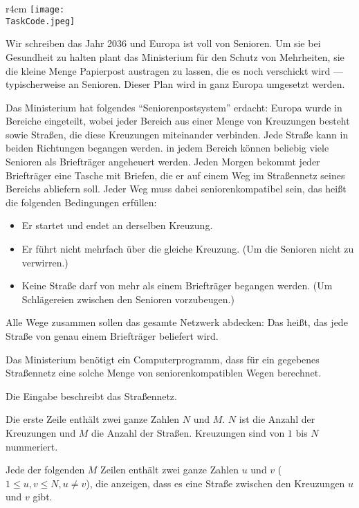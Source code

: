 \documentclass{boi2014-de}
\renewcommand{\TaskCode}{postmen}
\begin{document}
    \begin{wrapfigure}[8]{r}{4cm}
        \vspace{-18pt}
		\texttt{[image: \\TaskCode.jpeg]}
	\end{wrapfigure}
    Wir schreiben das Jahr 2036 und Europa ist voll von Senioren. Um sie bei Gesundheit zu halten plant das Ministerium für den Schutz von Mehrheiten, sie die kleine Menge Papierpost austragen zu lassen, die es noch verschickt wird --- typischerweise an Senioren. Dieser Plan wird in ganz Europa umgesetzt werden.
    
    Das Ministerium hat folgendes ``Seniorenpostsystem'' erdacht: Europa wurde in Bereiche eingeteilt, wobei jeder Bereich aus einer Menge von Kreuzungen besteht sowie Straßen, die diese Kreuzungen miteinander verbinden. Jede Straße kann in beiden Richtungen begangen werden. in jedem Bereich können beliebig viele Senioren als Briefträger angeheuert werden. Jeden Morgen bekommt jeder Briefträger eine Tasche mit Briefen, die er auf einem Weg im Straßennetz seines Bereichs abliefern soll. Jeder Weg muss dabei seniorenkompatibel sein, das heißt die folgenden Bedingungen erfüllen:

    \begin{itemize}
        \item Er startet und endet an derselben Kreuzung.
        \item Er führt nicht mehrfach über die gleiche Kreuzung. (Um die Senioren nicht zu verwirren.)
        \item Keine Straße darf von mehr als einem Briefträger begangen werden. (Um Schlägereien zwischen den Senioren vorzubeugen.)
    \end{itemize}
    
    Alle Wege zusammen sollen das gesamte Netzwerk abdecken: Das heißt, das jede Straße von genau einem Briefträger beliefert wird.

    \Task
    Das Ministerium benötigt ein Computerprogramm, dass für ein gegebenes Straßennetz eine solche Menge von seniorenkompatiblen Wegen berechnet.

    \Input
    Die Eingabe beschreibt das Straßennetz.
  
    Die erste Zeile enthält zwei ganze Zahlen $N$ und $M$.
    $N$ ist die Anzahl der Kreuzungen und $M$ die Anzahl der Straßen.
    Kreuzungen sind von $1$ bis $N$ nummeriert.
  
    Jede der folgenden $M$ Zeilen enthält zwei ganze Zahlen $u$ und $v$
    ($1 \le u, v \le N, u \neq v$), die anzeigen, dass es eine Straße zwischen den Kreuzungen $u$ und $v$ gibt.
\end{document}
